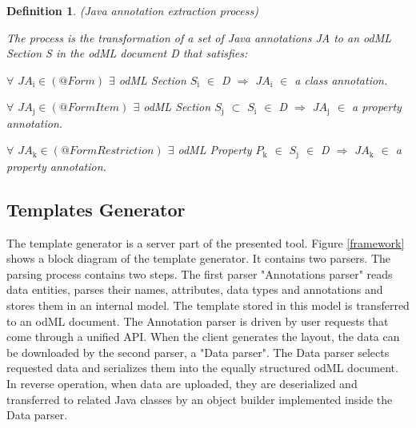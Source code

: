 \documentclass[conference]{IEEEtran}
\newtheorem{definition}{Definition}
\begin{document}
\begin{definition}
\label{def:Java_annotation_extraction_process}
(Java annotation extraction process)

\emph{The process is the transformation of a set of Java annotations JA to an odML Section S in the odML document D that satisfies:}

\emph{$\forall$ $JA{}_{\text{i}}\in {(@Form)}$ $\exists$ odML Section $S{}_{\text{i}}$ $\in$ D $\Rightarrow$ $JA{}_{\text{i}}$ $\in$ a class annotation}.

\emph{$\forall$ $JA{}_{\text{j}}\in {(@FormItem)}$ $\exists$ odML Section $S{}_{\text{j}}$ $\subset$ $S{}_{\text{i}}$ $\in$ D $\Rightarrow$ $JA{}_{\text{j}}$ $\in$ a property
annotation}.

\emph{$\forall$ $JA{}_{\text{k}}\in {(@FormRestriction)}$ $\exists$ odML Property $P{}_{\text{k}}$ $\in$ $S{}_{\text{j}}$ $\in$ D $\Rightarrow$ $JA{}_{\text{k}}$ $\in$ a property  annotation}.

\end{definition}

\subsection{Templates Generator}

The template generator is a server part of the presented tool. Figure \ref{framework} shows a block diagram of the template generator. It contains two parsers. The parsing process contains two steps. The first parser "Annotations parser" reads data entities, parses their names, attributes, data types and annotations and stores them in an internal model. The template stored in this model is transferred to an odML document. The Annotation parser is driven by user requests that come through a unified API. When the client generates the layout, the data can be downloaded by the second parser, a "Data parser". The Data parser selects requested data and serializes them into the equally structured odML document. In reverse operation,  when data are uploaded, they are deserialized and transferred to related Java classes by an object builder implemented inside the Data parser.
\end{document}
